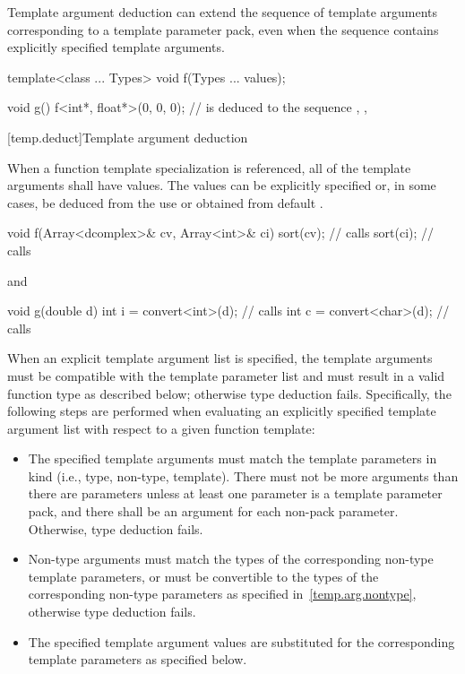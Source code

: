 \pnum
Template argument deduction can extend the sequence of template
arguments corresponding to a template parameter pack, even when the
sequence contains explicitly specified template arguments.
\enterexample
\begin{codeblock}
template<class ... Types> void f(Types ... values);

void g() {
  f<int*, float*>(0, 0, 0);     //  is deduced to the sequence , , 
}
\end{codeblock}
\exitexample

[temp.deduct]{Template argument deduction}

\pnum
When a
function template
specialization is referenced, all of the
template arguments shall have values.
The values can be
explicitly specified or, in some cases, be deduced from the use
or obtained from default
.
\enterexample

\begin{codeblock}
void f(Array<dcomplex>& cv, Array<int>& ci) {
  sort(cv);                     // calls 
  sort(ci);                     // calls 
}
\end{codeblock}

and

\begin{codeblock}
void g(double d) {
  int i = convert<int>(d);      // calls 
  int c = convert<char>(d);     // calls 
}
\end{codeblock}
\exitexample

\pnum
When an explicit template argument list is specified, the template
arguments must be compatible with the template parameter list and must
result in a valid function type as described below; otherwise type
deduction fails.  Specifically, the following steps are performed when
evaluating an explicitly specified template argument list with respect
to a given function template:

\begin{itemize}
\item The specified template arguments must match the template parameters in
kind (i.e., type, non-type, template). There
must not be more arguments than there are parameters
unless at least one parameter is a template parameter pack, and there shall be
an argument for each non-pack parameter.
Otherwise, type deduction fails.

\item Non-type arguments must match the types of the corresponding non-type
template parameters, or must be convertible to the types of the
corresponding non-type parameters as specified in~\ref{temp.arg.nontype}, otherwise type deduction fails.

\item The specified template argument values are substituted for the
corresponding template parameters as specified below.
\end{itemize}

